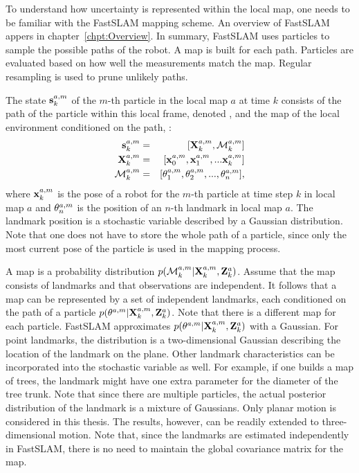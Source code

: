 To understand how uncertainty is represented within the local map, one
needs to be familiar with the FastSLAM \cite{Montemerlo2003} mapping
scheme.
An overview of FastSLAM appers in
chapter~\ref{chpt:Overview}. In summary, FastSLAM uses particles to
sample the possible paths of the robot. A map is built for each
path. Particles are evaluated based on how well the measurements match
the map.  Regular resampling is used to prune unlikely paths.

The state $\s{k}{a}{m}$ of the $m$-th particle in the local map $a$
at time $k$ consists of the path of the particle within this local
frame, denoted , and the map of the local environment
conditioned on the path, :
\begin{eqnarray}
 \s{k}{a}{m}    &=& [\Xall{k}{a}{m}, \map{k}{a}{m} ] \nonumber \\ 
 \Xall{k}{a}{m} &=& [\x{0}{a}{m}, \x{1}{a}{m}, ... \x{k}{a}{m}] \nonumber \\ 
 \map{k}{a}{m}  &=& [\mape{a}{m}{1}, \mape{a}{m}{2}, ..., \mape{a}{m}{n}], \nonumber
\end{eqnarray}
where $\x{k}{a}{m}$ is the pose of a robot for the $m$-th particle at
time step $k$ in local map $a$ and $\mape{a}{m}{n}$ is the position of
an $n$-th landmark in local map $a$. The landmark position is a
stochastic variable described by a Gaussian distribution. Note that
one does not have to store the whole path of a particle, since only
the most current pose of the particle is used in the mapping process.

A map is a probability distribution
$p(\map{k}{a}{m}|\Xall{k}{a}{m},\Zall{k}{a})$. Assume that the map
consists of landmarks and that observations are independent. It
follows that a map can be represented by a set of independent
landmarks, each conditioned on the path of a particle
$p(\mape{a}{m}{}|\Xall{k}{a}{m},\Zall{k}{a})$. Note that there is a
different map for each particle. FastSLAM approximates
$p(\mape{a}{m}{}|\Xall{k}{a}{m},\Zall{k}{a})$ with a Gaussian.  For
point landmarks, the distribution is a two-dimensional Gaussian
describing the location of the landmark on the plane. Other landmark
characteristics can be incorporated into the stochastic variable as
well. For example, if one builds a map of trees, the landmark might
have one extra parameter for the diameter of the tree trunk.  Note
that since there are multiple particles, the actual posterior
distribution of the landmark is a mixture of Gaussians.  Only planar
motion is considered in this thesis. The results, however, can be
readily extended to three-dimensional motion. Note that, since the
landmarks are estimated independently in FastSLAM, there is no need to
maintain the global covariance matrix for the map.

